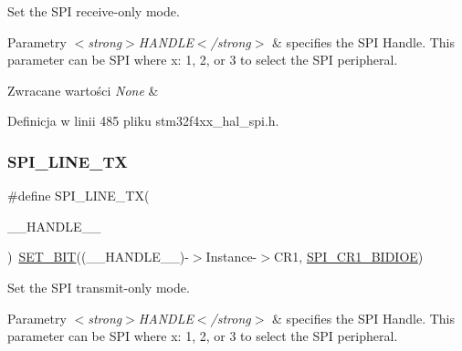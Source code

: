 Set the S\+PI receive-\/only mode. 


\begin{DoxyParams}{Parametry}
{\em $<$strong$>$\+H\+A\+N\+D\+L\+E$<$/strong$>$} & specifies the S\+PI Handle. This parameter can be S\+PI where x\+: 1, 2, or 3 to select the S\+PI peripheral. \\
\hline
\end{DoxyParams}

\begin{DoxyRetVals}{Zwracane wartości}
{\em None} & \\
\hline
\end{DoxyRetVals}


Definicja w linii 485 pliku stm32f4xx\+\_\+hal\+\_\+spi.\+h.

\mbox{\label{group___s_p_i___private___macros_gae3b2eb5e818e58b66474d42dedac5523}} 
\subsubsection{\texorpdfstring{S\+P\+I\+\_\+L\+I\+N\+E\+\_\+\+TX}{SPI\_1LINE\_TX}}
{\footnotesize\ttfamily \#define S\+P\+I\+\_\+L\+I\+N\+E\+\_\+\+TX(\begin{DoxyParamCaption}\item[{}]{\+\_\+\+\_\+\+H\+A\+N\+D\+L\+E\+\_\+\+\_\+ }\end{DoxyParamCaption})~\hyperlink{group___exported__macro_ga26474f43799fbade9cf300e21dd3a91a}{S\+E\+T\+\_\+\+B\+IT}((\+\_\+\+\_\+\+H\+A\+N\+D\+L\+E\+\_\+\+\_\+)-\/$>$Instance-\/$>$C\+R1, \hyperlink{group___peripheral___registers___bits___definition_ga378953916b7701bd49f063c0366b703f}{S\+P\+I\+\_\+\+C\+R1\+\_\+\+B\+I\+D\+I\+OE})}



Set the S\+PI transmit-\/only mode. 


\begin{DoxyParams}{Parametry}
{\em $<$strong$>$\+H\+A\+N\+D\+L\+E$<$/strong$>$} & specifies the S\+PI Handle. This parameter can be S\+PI where x\+: 1, 2, or 3 to select the S\+PI peripheral. \\
\hline
\end{DoxyParams}

